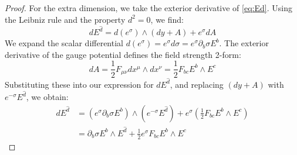 \begin{tcolorbox}[breakable]
\begin{proof}
			For the extra dimension, we take the exterior derivative of \eqref{eq:Ed}. Using the Leibniz rule and the property $d^2 = 0$, we find:
			\begin{equation}
				dE^{\hat{d}} = d(e^\sigma) \wedge (dy + A) + e^\sigma dA
			\end{equation}
			We expand the scalar differential $d(e^\sigma) = e^\sigma d\sigma = e^\sigma \partial_b \sigma E^b$. The exterior derivative of the gauge potential defines the field strength 2-form: 
			\begin{equation}
				dA = \frac{1}{2} F_{\mu\nu} dx^\mu \wedge dx^\nu = \frac{1}{2} F_{bc} E^b \wedge E^c
			\end{equation}
			Substituting these into our expression for $dE^{\hat{d}}$, and replacing $(dy + A)$ with $e^{-\sigma}E^{\hat{d}}$, we obtain:
			\begin{align}
				dE^{\hat{d}} &= (e^\sigma \partial_b \sigma E^b) \wedge (e^{-\sigma} E^{\hat{d}}) + e^\sigma \left( \frac{1}{2} F_{bc} E^b \wedge E^c \right) \nonumber \\
				&= \partial_b \sigma E^b \wedge E^{\hat{d}} + \frac{1}{2} e^\sigma F_{bc} E^b \wedge E^c
			\end{align}
				

\end{proof}
\end{tcolorbox}
